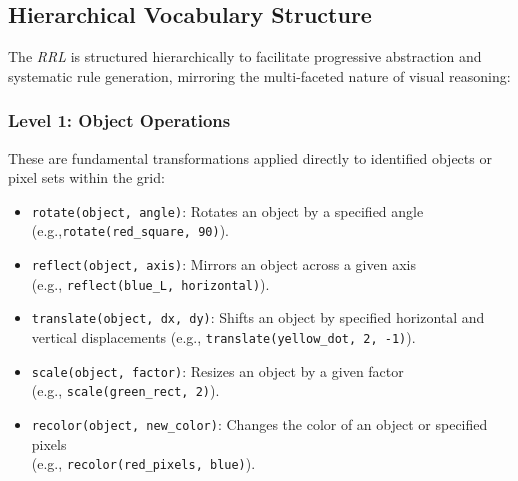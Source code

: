\documentclass[12pt]{article}
\newcommand{\rrl}{\textit{RRL}}
\begin{document}
\subsection{Hierarchical Vocabulary Structure}
The \rrl{} is structured hierarchically to facilitate progressive abstraction and systematic rule generation, mirroring the multi-faceted nature of visual reasoning:

\subsubsection{Level 1: Object Operations}
These are fundamental transformations applied directly to identified objects or pixel sets within the grid:
\begin{itemize}[noitemsep,topsep=0pt]
  \item \texttt{rotate(object, angle)}: Rotates an object by a specified angle \\(e.g.,\texttt{rotate(red\_square, 90)}).
  \item \texttt{reflect(object, axis)}: Mirrors an object across a given axis \\(e.g., \texttt{reflect(blue\_L, horizontal)}).
  \item \texttt{translate(object, dx, dy)}: Shifts an object by specified horizontal and vertical displacements (e.g., \texttt{translate(yellow\_dot, 2, -1)}).
  \item \texttt{scale(object, factor)}: Resizes an object by a given factor \\(e.g., \texttt{scale(green\_rect, 2)}).
  \item \texttt{recolor(object, new\_color)}: Changes the color of an object or specified pixels \\(e.g., \texttt{recolor(red\_pixels, blue)}).
\end{itemize}
\end{document}
